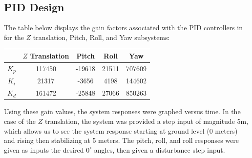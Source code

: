 \documentclass[12pt]{article}
\begin{document}
\subsection*{PID Design}
The table below displays the gain factors associated with the PID controllers in for the $Z$ translation, Pitch, Roll, 
and Yaw subsystems:
\begin{center}
  \begin{tabular}{||c c c c c||} 
  \hline
   & $Z$ Translation & Pitch & Roll & Yaw \\ [0.5ex] 
  \hline\hline
  $K_p$ & 117450 & -19618 & 21511 & 707609 \\ 
  \hline
  $K_i$ & 21317 & -3656 & 4198 & 144602 \\
  \hline
  $K_d$ & 161472 & -25848 & 27066 & 850263 \\
  \hline
 \end{tabular}
\end{center}
Using these gain values, the system responses were graphed versus time. In the case of the $Z$ translation, the system 
was provided a step input of magnitude 5m, which allows us to see the system response starting at ground level (0 meters)
and rising then stabilizing at 5 meters. The pitch, roll, and roll responses were given as inputs the desired $0^{\circ}$ 
angles, then given a disturbance step input.
\end{document}
